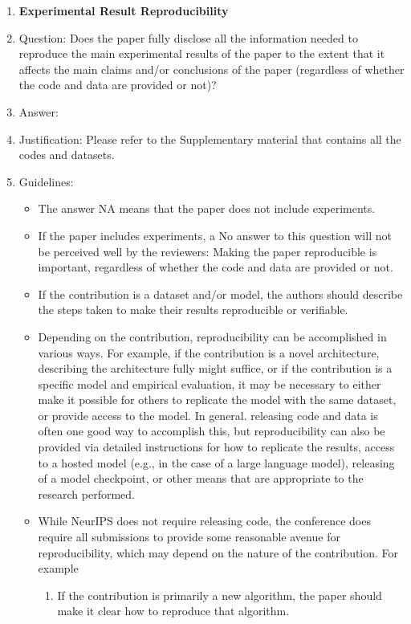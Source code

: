 \documentclass{article}
\begin{document}
\begin{enumerate}
    \item {\bf Experimental Result Reproducibility}
    \item[] Question: Does the paper fully disclose all the information needed to reproduce the main experimental results of the paper to the extent that it affects the main claims and/or conclusions of the paper (regardless of whether the code and data are provided or not)?
    \item[] Answer: \answerYes{} %
    \item[] Justification: Please refer to the Supplementary material that contains all the codes and datasets.
    \item[] Guidelines:
    \begin{itemize}
        \item The answer NA means that the paper does not include experiments.
        \item If the paper includes experiments, a No answer to this question will not be perceived well by the reviewers: Making the paper reproducible is important, regardless of whether the code and data are provided or not.
        \item If the contribution is a dataset and/or model, the authors should describe the steps taken to make their results reproducible or verifiable. 
        \item Depending on the contribution, reproducibility can be accomplished in various ways. For example, if the contribution is a novel architecture, describing the architecture fully might suffice, or if the contribution is a specific model and empirical evaluation, it may be necessary to either make it possible for others to replicate the model with the same dataset, or provide access to the model. In general. releasing code and data is often one good way to accomplish this, but reproducibility can also be provided via detailed instructions for how to replicate the results, access to a hosted model (e.g., in the case of a large language model), releasing of a model checkpoint, or other means that are appropriate to the research performed.
        \item While NeurIPS does not require releasing code, the conference does require all submissions to provide some reasonable avenue for reproducibility, which may depend on the nature of the contribution. For example
        \begin{enumerate}
            \item If the contribution is primarily a new algorithm, the paper should make it clear how to reproduce that algorithm.

\end{enumerate}
\end{itemize}
\end{enumerate}
\end{document}

